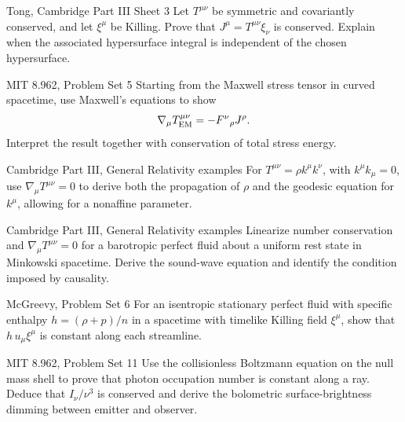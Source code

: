 \begin{exercise}{Tong, Cambridge Part III Sheet 3}
Let \(T^{\mu\nu}\) be symmetric and covariantly conserved, and let
\(\xi^\mu\) be Killing.  Prove that \(J^\mu=T^{\mu\nu}\xi_\nu\) is conserved.
Explain when the associated hypersurface integral is independent of the
chosen hypersurface.
\end{exercise}

\begin{exercise}{MIT 8.962, Problem Set 5}
Starting from the Maxwell stress tensor in curved spacetime, use Maxwell's
equations to show
\[
\nabla_\mu T_{\rm EM}^{\mu\nu}=-F^\nu{}_\rho J^\rho.
\]
Interpret the result together with conservation of total stress energy.
\end{exercise}

\begin{exercise}{Cambridge Part III, General Relativity examples}
For \(T^{\mu\nu}=\rho k^\mu k^\nu\), with \(k^\mu k_\mu=0\), use
\(\nabla_\mu T^{\mu\nu}=0\) to derive both the propagation of \(\rho\) and the
geodesic equation for \(k^\mu\), allowing for a nonaffine parameter.
\end{exercise}

\begin{exercise}{Cambridge Part III, General Relativity examples}
Linearize number conservation and \(\nabla_\mu T^{\mu\nu}=0\) for a
barotropic perfect fluid about a uniform rest state in Minkowski spacetime.
Derive the sound-wave equation and identify the condition imposed by
causality.
\end{exercise}

\begin{exercise}{McGreevy, Problem Set 6}
For an isentropic stationary perfect fluid with specific enthalpy
\(h=(\rho+p)/n\) in a spacetime with timelike Killing field \(\xi^\mu\), show
that \(h\,u_\mu\xi^\mu\) is constant along each streamline.
\end{exercise}

\begin{exercise}{MIT 8.962, Problem Set 11}
Use the collisionless Boltzmann equation on the null mass shell to prove that
photon occupation number is constant along a ray.  Deduce that
\(I_\nu/\nu^3\) is conserved and derive the bolometric surface-brightness
dimming between emitter and observer.
\end{exercise}

